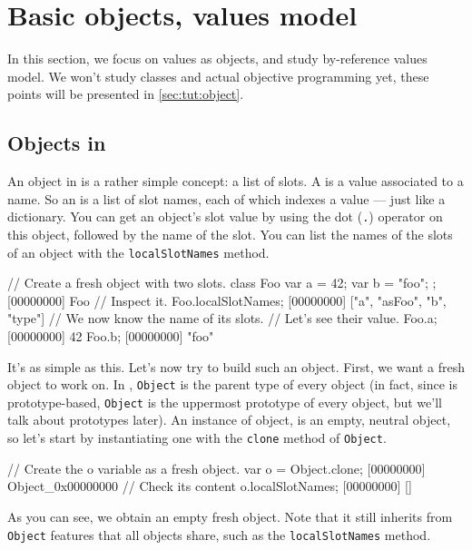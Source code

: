 \chapter{Basic objects, \us values model} %
\label{sec:tut:value}

In this section, we focus on \us values as objects, and study \us
by-reference values model. We won't study classes and actual objective
programming yet, these points will be presented in
\autoref{sec:tut:object}.

\section{Objects in \us}
\label{sec:tut:objects}
An object in \us is a rather simple concept: a list of slots. A
 is a value associated to a name. So an  is a
list of slot names, each of which indexes a value --- just like a
dictionary. You can get an object's slot value by using the dot
(\lstinline{.}) operator on this object, followed by the name of the
slot. You can list the names of the slots of an object with the
\lstinline{localSlotNames} method.

\begin{urbiscript}
// Create a fresh object with two slots.
class Foo { var a = 42; var b = "foo"; };
[00000000] Foo
// Inspect it.
Foo.localSlotNames;
[00000000] ["a", "asFoo", "b", "type"]
// We now know the name of its slots.
// Let's see their value.
Foo.a;
[00000000] 42
Foo.b;
[00000000] "foo"
\end{urbiscript}

It's as simple as this. Let's now try to build such an object. First,
we want a fresh object to work on. In \us, \lstinline{Object} is the
parent type of every object (in fact, since \us is prototype-based,
\lstinline{Object} is the uppermost prototype of every object, but
we'll talk about prototypes later). An instance of object, is an
empty, neutral object, so let's start by instantiating one with the
\lstinline{clone} method of \lstinline{Object}.

\begin{urbiscript}
// Create the o variable as a fresh object.
var o = Object.clone;
[00000000] Object_0x00000000
// Check its content
o.localSlotNames;
[00000000] []
\end{urbiscript}

As you can see, we obtain an empty fresh object. Note that it still
inherits from \lstinline{Object} features that all objects share, such as
the \lstinline{localSlotNames} method.

